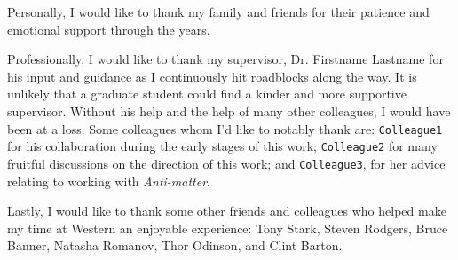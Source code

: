% 
%
Personally, I would like to thank my family and friends for their patience and emotional support through the years.

Professionally, I would like to thank my supervisor, Dr. Firstname Lastname  for his input and guidance as I continuously hit roadblocks along the way.  It is unlikely that a graduate student could find a kinder and more supportive supervisor.  Without his help and the help of many other colleagues, I would have been at a loss.  Some colleagues whom I'd like to notably thank are: \texttt{Colleague1} for his collaboration during the early stages of this work; \texttt{Colleague2} for many fruitful discussions on the direction of this work; and \texttt{Colleague3}, for her advice relating to working with \textit{Anti-matter}.

Lastly, I would like to thank some other friends and colleagues who helped make my time at Western an enjoyable experience: Tony Stark, Steven Rodgers, Bruce Banner, Natasha Romanov, Thor Odinson, and Clint Barton. 